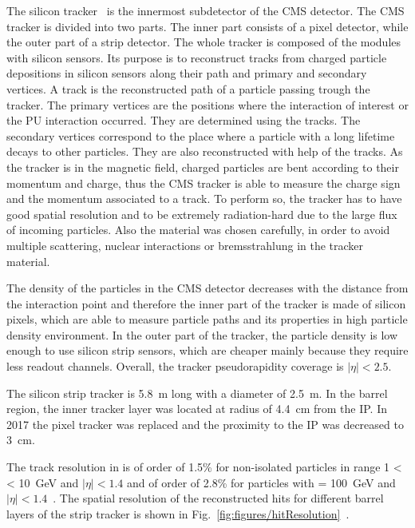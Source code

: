 The silicon tracker~\cite{CMS:1997tlf, CMS:2000eqx} is the innermost subdetector of the CMS detector. The CMS tracker is divided into two parts. The inner part consists of a pixel detector, while the outer part of a strip detector. The whole tracker is composed of the modules with silicon sensors. Its purpose is to reconstruct tracks from charged particle depositions in silicon sensors along their path and primary and secondary vertices. A track is the reconstructed path of a particle passing trough the tracker. The primary vertices are the positions where the interaction of interest or the PU interaction occurred. They are determined using the tracks. The secondary vertices correspond to the place where a particle with a long lifetime decays to other particles. They are also reconstructed with help of the tracks. As the tracker is in the magnetic field, charged particles are bent according to their momentum and charge, thus the CMS tracker is able to measure the charge sign and the momentum associated to a track. To perform so, the tracker has to have good spatial resolution and to be extremely radiation-hard due to the large flux of incoming particles. Also the material was chosen carefully, in order to avoid multiple scattering, nuclear interactions or bremsstrahlung in the tracker material.

The density of the particles in the CMS detector decreases with the distance from the interaction point and therefore the inner part of the tracker is made of silicon pixels, which are able to measure particle paths and its properties in high particle density environment. In the outer part of the tracker, the particle density is low enough to use silicon strip sensors, which are cheaper mainly because they require less readout channels. Overall, the tracker pseudorapidity coverage is  $|\eta| < 2.5$.

The silicon strip tracker is 5.8~m long with a diameter of 2.5~m. In the barrel region, the inner tracker layer was located at radius of 4.4~cm from the IP. In 2017 the pixel tracker was replaced and the proximity to the IP was decreased to 3~cm. 

The track resolution in \pt is of order of 1.5\% for non-isolated particles in range 1 < \pt < 10~GeV and $|\eta| < 1.4$ and of order of 2.8\% for particles with \pt = 100~GeV and $|\eta| < 1.4$~\cite{TRK-11-001}. The spatial resolution of the reconstructed hits for different barrel layers of the strip tracker is shown in Fig.~\ref{fig:figures/hitResolution}~\cite{website:hitEff}.


